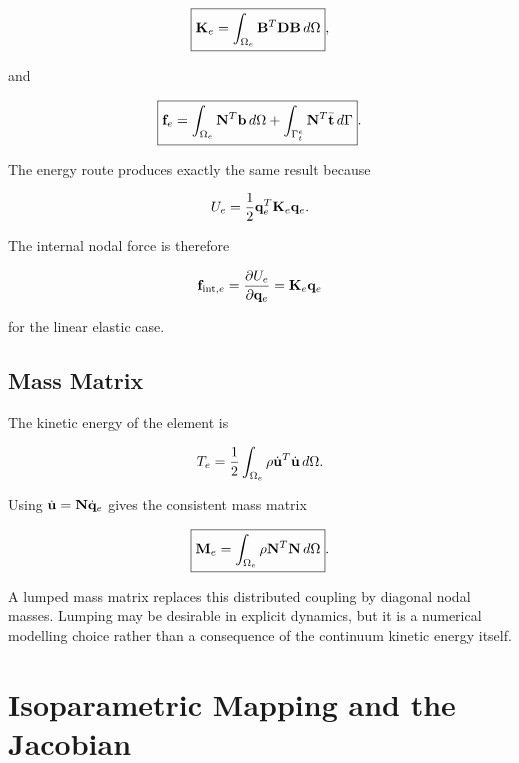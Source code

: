 \begin{equation}\label{eq:element-stiffness}
    \boxed{
    \mathbf{K}_e
    =
    \int_{\Omega_e}
    \mathbf{B}^T\mathbf{D}\mathbf{B}\,d\Omega
    },
\end{equation}

and

\begin{equation}\label{eq:element-load}
    \boxed{
    \mathbf{f}_e
    =
    \int_{\Omega_e}\mathbf{N}^T\mathbf{b}\,d\Omega
    +
    \int_{\Gamma_t^e}\mathbf{N}^T\bar{\mathbf{t}}\,d\Gamma
    }.
\end{equation}

The energy route produces exactly the same result because

\begin{equation}
    U_e
    =\frac{1}{2}\mathbf{q}_e^T\mathbf{K}_e\mathbf{q}_e.
\end{equation}

The internal nodal force is therefore

\begin{equation}
    \mathbf{f}_{\mathrm{int},e}
    =\frac{\partial U_e}{\partial\mathbf{q}_e}
    =\mathbf{K}_e\mathbf{q}_e
\end{equation}

for the linear elastic case.

\subsection{Mass Matrix}

The kinetic energy of the element is

\begin{equation}
    T_e
    =\frac{1}{2}
    \int_{\Omega_e}
    \rho\dot{\mathbf{u}}^T\dot{\mathbf{u}}\,d\Omega.
\end{equation}

Using $\dot{\mathbf{u}}=\mathbf{N}\dot{\mathbf{q}}_e$ gives the consistent mass matrix

\begin{equation}\label{eq:consistent-mass}
    \boxed{
    \mathbf{M}_e
    =\int_{\Omega_e}
    \rho\mathbf{N}^T\mathbf{N}\,d\Omega
    }.
\end{equation}

A lumped mass matrix replaces this distributed coupling by diagonal nodal masses.
Lumping may be desirable in explicit dynamics, but it is a numerical modelling
choice rather than a consequence of the continuum kinetic energy itself.

\section{Isoparametric Mapping and the Jacobian}

